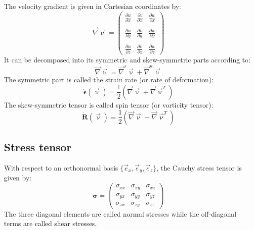 The velocity gradient is given in Cartesian coordinates by:
\begin{equation}
\vec\nabla\vec\upnu = 
\left(
\begin{array}{ccc}
\frac{\partial u}{\partial x} & \frac{\partial v}{\partial x} & \frac{\partial w}{\partial x} \\\\
\frac{\partial u}{\partial y} & \frac{\partial v}{\partial y} & \frac{\partial w}{\partial y} \\\\
\frac{\partial u}{\partial z} & \frac{\partial v}{\partial z} & \frac{\partial w}{\partial z} 
\end{array}
\right)
\end{equation}
It can be decomposed into its symmetric and skew-symmetric parts according to:
\begin{equation}
\vec\nabla\vec\upnu = \vec\nabla^s\vec\upnu + \vec\nabla^w\vec\upnu
\end{equation}
The symmetric part is called the strain rate (or rate of deformation):
\begin{equation}
\dot{\bm \epsilon}(\vec \upnu) = \frac{1}{2}\left( \vec\nabla\vec\upnu + \vec\nabla\vec\upnu^T \right)
\end{equation}
The skew-symmetric tensor is called spin tensor (or vorticity tensor):
\begin{equation}
\dot{\bm R}(\vec \upnu) = \frac{1}{2}\left( \vec\nabla\vec\upnu - \vec\nabla\vec\upnu^T \right)
\end{equation}

\subsection{Stress tensor}

  

With respect to an orthonormal basis $\{\vec{e}_x,\vec{e}_y,\vec{e}_z\}$, the Cauchy stress tensor
is given by:
\begin{equation}
{\bm \sigma}=
\left(
\begin{array}{ccc}
\sigma_{xx} & \sigma_{xy} & \sigma_{xz} \\
\sigma_{yx} & \sigma_{yy} & \sigma_{yz} \\
\sigma_{zx} & \sigma_{zy} & \sigma_{zz} 
\end{array}
\right)
\end{equation}
The three diagonal elements are called normal stresses while the off-diagonal terms 
are called shear stresses.

